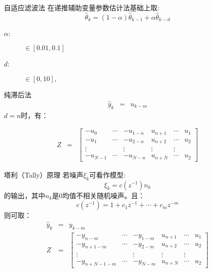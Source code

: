 \begin{frame}{自适应滤波法}
在递推辅助变量参数估计法基础上取:
$$\hat\theta_k=(1-\alpha)\hat\theta_{k-1}+\alpha\hat\theta_{k-d}$$
\begin{description}
\item[$\alpha$:] $\in [0.01,0.1]$
\item[$d$:] $\in [0,10],$
\end{description}
\end{frame}

\begin{frame}{纯滞后法}
\begin{eqnarray*}
\hat y_k &=& u_{k-m}
\end{eqnarray*}
$d=n$时，有：

\begin{eqnarray*}
Z&=&\begin{bmatrix}
-u_0 & \cdots & -u_{1-n} & u_{n+1} & \cdots & u_1 \\
-u_1 & \cdots & -u_{2-n} & u_{n+2} & \cdots & u_2 \\
\vdots &      & \vdots   &  \vdots &        \vdots \\
-u_{N-1} & \cdots & -u_{N-n} & u_{n+N} & \cdots & u_2 
\end{bmatrix}
\end{eqnarray*}
\end{frame}

\begin{frame}{塔利（Tally）原理}
若噪声$\xi_k$可看作模型:
$$\xi_k = c(z^{-1})n_k$$
的输出，其中$n_k$是0均值不相关随机噪声。且：
$$c(z^{-1}) = 1+c_1 z^{-1}+\cdots +c_m z^{-m}$$
则可取：
\begin{eqnarray*}
\hat y_k &=& y_{k-m}\\
Z&=&\begin{bmatrix}
-y_{n-m} & \cdots & -y_{1-m} & u_{n+1} & \cdots & u_1 \\
-y_{n+1-m} & \cdots & -y_{2-m} & u_{n+2} & \cdots & u_2 \\
\vdots &      & \vdots   &  \vdots &        \vdots \\
-y_{n+N-1-m} & \cdots & -y_{N-m} & u_{n+N} & \cdots & u_2 
\end{bmatrix}
\end{eqnarray*}
\end{frame}

